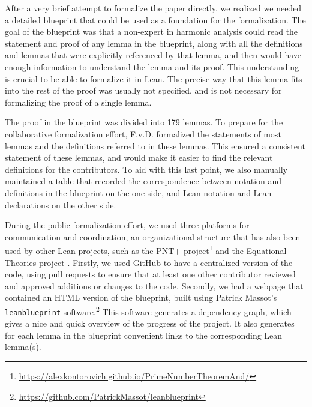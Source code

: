 \documentclass[12pt]{amsart}
\theoremstyle{definition}
\theoremstyle{plain}
\begin{document}
After a very brief attempt to formalize the paper directly,
we realized we needed a detailed blueprint that could be used as a foundation for the formalization.
The goal of the blueprint was that a non-expert in harmonic analysis
could read the statement and proof of any lemma in the blueprint,
along with all the definitions and lemmas that were explicitly referenced by that lemma,
and then would have enough information to understand the lemma and its proof.
This understanding is crucial to be able to formalize it in Lean.
The precise way that this lemma fits into the rest of the proof was usually not specified,
and is not necessary for formalizing the proof of a single lemma.

The proof in the blueprint was divided into 179 lemmas.
To prepare for the collaborative formalization effort,
F.v.D. formalized the statements of most lemmas and the definitions referred to in these lemmas.
This ensured a consistent statement of these lemmas,
and would make it easier to find the relevant definitions for the contributors.
To aid with this last point, we also manually maintained a table
that recorded the correspondence between notation and definitions in the blueprint on the one side,
and Lean notation and Lean declarations on the other side.

During the public formalization effort, we used three platforms for communication and coordination,
an organizational structure that has also been used by other Lean projects,
such as the PNT$+$ project\footnote{\url{https://alexkontorovich.github.io/PrimeNumberTheoremAnd/}}
and the Equational Theories project \cite{tao2025equationaltheories}.
Firstly, we used GitHub to have a centralized version of the code,
using pull requests to ensure that at least one other contributor reviewed and approved additions or changes to the code.
Secondly, we had a webpage that contained an HTML version of the blueprint,
built using Patrick Massot's \texttt{leanblueprint} software.\footnote{\url{https://github.com/PatrickMassot/leanblueprint}}
This software generates a dependency graph, which gives a nice and quick overview of the progress of the project.
It also generates for each lemma in the blueprint convenient links to the corresponding Lean lemma(s).
\end{document}
